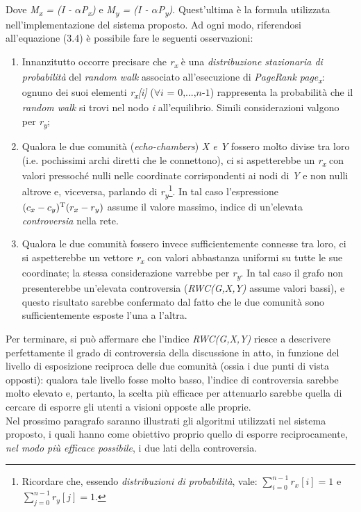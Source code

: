 \begin{enumerate}
\begin{equation}
\end{equation}
\\
Dove \textit{M\textsubscript{x} = (I - $\alpha$P\textsubscript{x})} e \textit{M\textsubscript{y} = (I - $\alpha$P\textsubscript{y})}. Quest'ultima è la formula utilizzata nell'implementazione del sistema proposto. Ad ogni modo, riferendosi all'equazione (3.4) è possibile fare le seguenti osservazioni:
\begin{enumerate}
\item Innanzitutto occorre precisare che \textit{r\textsubscript{x}} è una \textit{distribuzione stazionaria di probabilità} del \textit{random walk} associato all'esecuzione di \textit{PageRank page\textsubscript{x}}: ognuno dei suoi elementi \textit{r\textsubscript{x}[i]} ($\forall \textit{i = 0,...,n-1}$) rappresenta la probabilità che il \textit{random walk} si trovi nel nodo \textit{i} all'equilibrio. Simili considerazioni valgono per \textit{r\textsubscript{y}};
\item Qualora le due comunità (\textit{echo-chambers}) \textit{X e Y} fossero molto divise tra loro (i.e. pochissimi archi diretti che le connettono), ci si aspetterebbe un \textit{r\textsubscript{x}} con valori pressoché nulli nelle coordinate corrispondenti ai nodi di \textit{Y} e non nulli altrove e, viceversa, parlando di \textit{r\textsubscript{y}}\footnote{Ricordare che, essendo \textit{distribuzioni di probabilità}, vale: $\sum_{i=0}^{n-1} r_x[i] = 1$ e $\sum_{j=0}^{n-1} r_y[j] = 1$.}. In tal caso l'espressione $(c_x - c_y)\textsuperscript{T}(r_x - r_y)$ assume il valore massimo, indice di un'elevata \textit{controversia} nella rete.
\item Qualora le due comunità fossero invece sufficientemente connesse tra loro, ci si aspetterebbe un vettore \textit{r\textsubscript{x}} con valori abbastanza uniformi su tutte le sue coordinate; la stessa considerazione varrebbe per \textit{r\textsubscript{y}}. In tal caso il grafo non presenterebbe un'elevata controversia (\textit{RWC(G,X,Y)} assume valori bassi), e questo risultato sarebbe confermato dal fatto che le due comunità sono sufficientemente esposte l'una a l'altra.
\end{enumerate}
\end{enumerate}
Per terminare, si può affermare che l'indice \textit{RWC(G,X,Y)} riesce a descrivere perfettamente il grado di controversia della discussione in atto, in funzione del livello di esposizione reciproca delle due comunità (ossia i due punti di vista opposti): qualora tale livello fosse molto basso, l'indice di controversia sarebbe molto elevato e, pertanto, la scelta più efficace per attenuarlo sarebbe quella di cercare di esporre gli utenti a visioni opposte alle proprie. 
\\Nel prossimo paragrafo saranno illustrati gli algoritmi utilizzati nel sistema proposto, i quali hanno come obiettivo proprio quello di esporre reciprocamente, \textit{nel modo più efficace possibile}, i due lati della controversia. 

